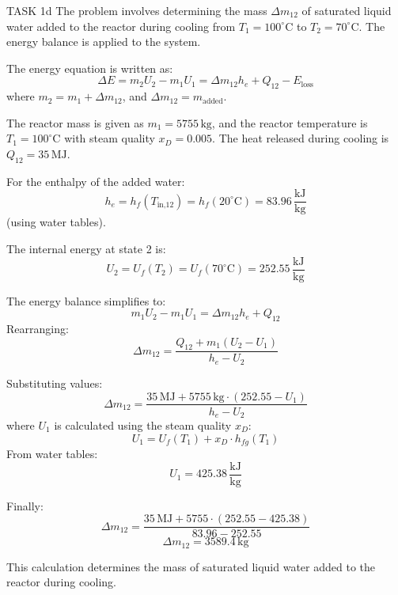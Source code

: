 TASK 1d  
The problem involves determining the mass \( \Delta m_{12} \) of saturated liquid water added to the reactor during cooling from \( T_1 = 100^\circ\text{C} \) to \( T_2 = 70^\circ\text{C} \). The energy balance is applied to the system.

The energy equation is written as:  
\[
\Delta E = m_2 U_2 - m_1 U_1 = \Delta m_{12} h_e + Q_{12} - E_{\text{loss}}
\]  
where \( m_2 = m_1 + \Delta m_{12} \), and \( \Delta m_{12} = m_{\text{added}} \).  

The reactor mass is given as \( m_1 = 5755 \, \text{kg} \), and the reactor temperature is \( T_1 = 100^\circ\text{C} \) with steam quality \( x_D = 0.005 \). The heat released during cooling is \( Q_{12} = 35 \, \text{MJ} \).  

For the enthalpy of the added water:  
\[
h_e = h_f(T_{\text{in,12}}) = h_f(20^\circ\text{C}) = 83.96 \, \frac{\text{kJ}}{\text{kg}}
\]  
(using water tables).  

The internal energy at state 2 is:  
\[
U_2 = U_f(T_2) = U_f(70^\circ\text{C}) = 252.55 \, \frac{\text{kJ}}{\text{kg}}
\]  

The energy balance simplifies to:  
\[
m_1 U_2 - m_1 U_1 = \Delta m_{12} h_e + Q_{12}
\]  
Rearranging:  
\[
\Delta m_{12} = \frac{Q_{12} + m_1 (U_2 - U_1)}{h_e - U_2}
\]  

Substituting values:  
\[
\Delta m_{12} = \frac{35 \, \text{MJ} + 5755 \, \text{kg} \cdot (252.55 - U_1)}{h_e - U_2}
\]  
where \( U_1 \) is calculated using the steam quality \( x_D \):  
\[
U_1 = U_f(T_1) + x_D \cdot h_{fg}(T_1)
\]  
From water tables:  
\[
U_1 = 425.38 \, \frac{\text{kJ}}{\text{kg}}
\]  

Finally:  
\[
\Delta m_{12} = \frac{35 \, \text{MJ} + 5755 \cdot (252.55 - 425.38)}{83.96 - 252.55}
\]  
\[
\Delta m_{12} = 3589.4 \, \text{kg}
\]  

This calculation determines the mass of saturated liquid water added to the reactor during cooling.